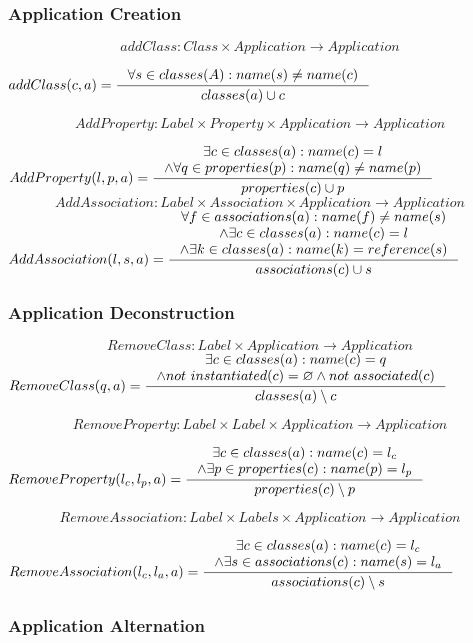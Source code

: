 \documentclass[11pt]{article}
\begin{document}
\subsubsection{Application Creation}
$$addClass: Class \times Application \rightarrow Application $$

$
addClass(c, a) = \inference{\forall s \in classes(A) : name(s) \neq name(c)}
{classes(a) \cup c}
$

$$AddProperty : Label \times Property \times Application \rightarrow Application $$

$
AddProperty(l, p, a) = \inference{\exists c \in classes(a) : name(c) = l \\ \wedge \forall q \in  properties(p) : name(q) \neq name(p)}{properties(c) \cup p }
$
$$AddAssociation : Label \times Association \times Application \rightarrow Application $$
$
AddAssociation(l, s, a) = \inference{\forall f \in associations(a) : name(f) \neq name(s) \\ \wedge \exists c \in classes(a) : name(c) = l \\ \wedge \exists k \in classes(a) : name(k) = reference(s) }{associations(c) \cup s}
$

\subsubsection{Application Deconstruction}
$$RemoveClass: Label \times Application \rightarrow Application $$
$
RemoveClass(q, a) = \inference{\exists c \in classes(a) : name(c) = q \\
\wedge not$ $instantiated(c) = \varnothing \wedge not$ $associated(c)}{classes(a) \setminus c }
$

$$RemoveProperty: Label \times Label \times Application \rightarrow Application $$

$
RemoveProperty(l_c, l_p, a) = \inference{\exists c \in classes(a) : name(c) = l_c \\ \wedge \exists p \in properties(c) : name(p) = l_p}{properties(c) \setminus p }
$

$$RemoveAssociation : Label \times Labels \times Application \rightarrow Application $$

$
RemoveAssociation(l_c, l_a, a) = \inference{\exists c \in classes(a) : name(c) = l_c \\ \wedge \exists s \in associations(c) : name(s) = l_a }{associations(c) \setminus s}
$

\subsubsection{Application Alternation}
\end{document}
